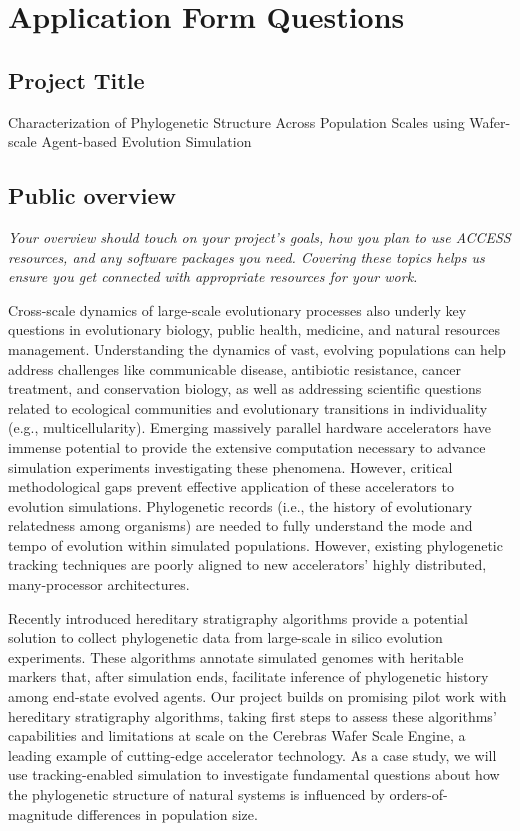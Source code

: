 \section{Application Form Questions}

\subsection{Project Title}

Characterization of Phylogenetic Structure Across Population Scales using Wafer-scale Agent-based Evolution Simulation

\subsection{Public overview}

\begin{displayquote} \itshape
Your overview should touch on your project's goals, how you plan to use ACCESS resources, and any software packages you need.
Covering these topics helps us ensure you get connected with appropriate resources for your work.
\end{displayquote}

Cross-scale dynamics of large-scale evolutionary processes also underly key questions in evolutionary biology, public health, medicine, and natural resources management.
Understanding the dynamics of vast, evolving populations can help address challenges like communicable disease, antibiotic resistance, cancer treatment, and conservation biology, as well as addressing scientific questions related to ecological communities and evolutionary transitions in individuality (e.g., multicellularity).
Emerging massively parallel hardware accelerators have immense potential to provide the extensive computation necessary to advance simulation experiments investigating these phenomena.
However, critical methodological gaps prevent effective application of these accelerators to evolution simulations.
Phylogenetic records (i.e., the history of evolutionary relatedness among organisms) are needed to fully understand the mode and tempo of evolution within simulated populations.
However, existing phylogenetic tracking techniques are poorly aligned to new accelerators' highly distributed, many-processor architectures.

Recently introduced hereditary stratigraphy algorithms provide a potential solution to collect phylogenetic data from large-scale in silico evolution experiments.
These algorithms annotate simulated genomes with heritable markers that, after simulation ends, facilitate inference of phylogenetic history among end-state evolved agents.
Our project builds on promising pilot work with hereditary stratigraphy algorithms, taking first steps to assess these algorithms' capabilities and limitations at scale on the Cerebras Wafer Scale Engine, a leading example of cutting-edge accelerator technology.
As a case study, we will use tracking-enabled simulation to investigate fundamental questions about how the phylogenetic structure of natural systems is influenced by orders-of-magnitude differences in population size.

